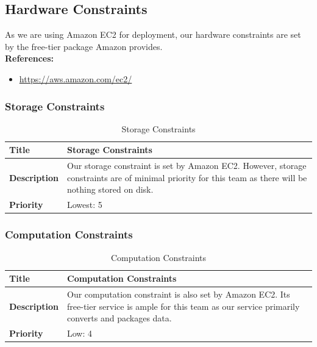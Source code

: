 \documentclass{article}
\begin{document}
\subsection{Hardware Constraints}

As we are using Amazon EC2 for deployment, our hardware constraints are set by the free-tier package Amazon provides. \\

\textbf{References:}
\begin{itemize}
	\item \url{https://aws.amazon.com/ec2/}
\end{itemize}

\subsubsection{Storage Constraints}

\begin{table}[H]
	\caption{Storage Constraints}
	\begin{tabularx}{\textwidth}{|l|X|}
		\hline
		\textbf{Title}       & Storage Constraints                          \\ \hline
		\textbf{Description} & Our storage constraint is set by Amazon EC2.
		However, storage constraints are of minimal priority for this team
		as there will be nothing stored on disk.        \\ \hline
		\textbf{Priority}    & Lowest: 5                                    \\ \hline
	\end{tabularx}
\end{table}

\subsubsection{Computation Constraints}

\begin{table}[H]
	\caption{Computation Constraints}
	\begin{tabularx}{\textwidth}{|l|X|}
		\hline
		\textbf{Title}       & Computation Constraints                          \\ \hline
		\textbf{Description} & Our computation constraint is also set by Amazon
		EC2. Its free-tier service is ample for this team as our service
		primarily converts and packages data.          \\ \hline
		\textbf{Priority}    & Low: 4                                           \\ \hline
	\end{tabularx}
\end{table}
\end{document}
